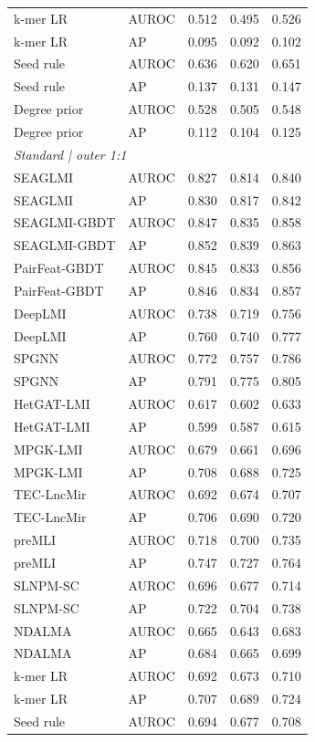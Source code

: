 {\begin{longtable}{lllll}
k-mer LR & AUROC & 0.512 & 0.495 & 0.526 \\
k-mer LR & AP & 0.095 & 0.092 & 0.102 \\
Seed rule & AUROC & 0.636 & 0.620 & 0.651 \\
Seed rule & AP & 0.137 & 0.131 & 0.147 \\
Degree prior & AUROC & 0.528 & 0.505 & 0.548 \\
Degree prior & AP & 0.112 & 0.104 & 0.125 \\
\multicolumn{5}{l}{\textit{Standard | outer 1:1}}\\
SEAGLMI & AUROC & 0.827 & 0.814 & 0.840 \\
SEAGLMI & AP & 0.830 & 0.817 & 0.842 \\
SEAGLMI-GBDT & AUROC & 0.847 & 0.835 & 0.858 \\
SEAGLMI-GBDT & AP & 0.852 & 0.839 & 0.863 \\
PairFeat-GBDT & AUROC & 0.845 & 0.833 & 0.856 \\
PairFeat-GBDT & AP & 0.846 & 0.834 & 0.857 \\
DeepLMI & AUROC & 0.738 & 0.719 & 0.756 \\
DeepLMI & AP & 0.760 & 0.740 & 0.777 \\
SPGNN & AUROC & 0.772 & 0.757 & 0.786 \\
SPGNN & AP & 0.791 & 0.775 & 0.805 \\
HetGAT-LMI & AUROC & 0.617 & 0.602 & 0.633 \\
HetGAT-LMI & AP & 0.599 & 0.587 & 0.615 \\
MPGK-LMI & AUROC & 0.679 & 0.661 & 0.696 \\
MPGK-LMI & AP & 0.708 & 0.688 & 0.725 \\
TEC-LncMir & AUROC & 0.692 & 0.674 & 0.707 \\
TEC-LncMir & AP & 0.706 & 0.690 & 0.720 \\
preMLI & AUROC & 0.718 & 0.700 & 0.735 \\
preMLI & AP & 0.747 & 0.727 & 0.764 \\
SLNPM-SC & AUROC & 0.696 & 0.677 & 0.714 \\
SLNPM-SC & AP & 0.722 & 0.704 & 0.738 \\
NDALMA & AUROC & 0.665 & 0.643 & 0.683 \\
NDALMA & AP & 0.684 & 0.665 & 0.699 \\
k-mer LR & AUROC & 0.692 & 0.673 & 0.710 \\
k-mer LR & AP & 0.707 & 0.689 & 0.724 \\
Seed rule & AUROC & 0.694 & 0.677 & 0.708 \\

\end{longtable}}
